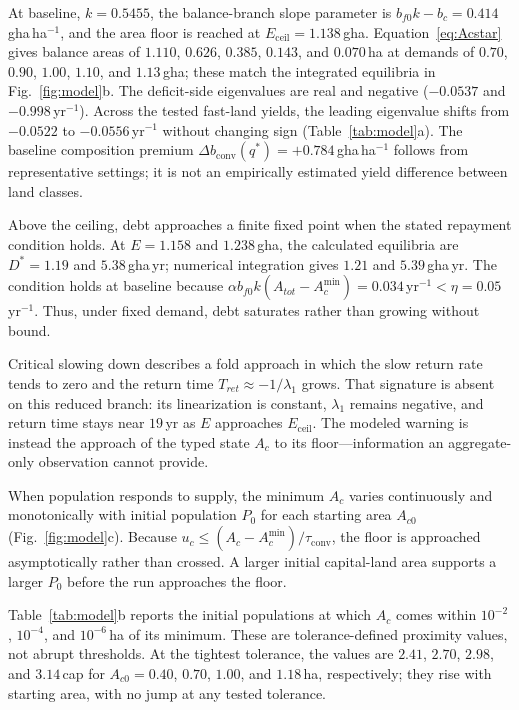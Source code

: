 \documentclass[preprint,12pt,authoryear]{elsarticle}
\newcommand{\dconv}{\Delta b_{\mathrm{conv}}}
\newcommand{\Eceil}{E_{\mathrm{ceil}}}
\newcommand{\Acmin}{A_c^{\min}}
\newcommand{\tconv}{\tau_{\mathrm{conv}}}
\begin{document}
At baseline, $k=0.5455$, the balance-branch slope parameter is $b_{f0}k-b_c=0.414$\,gha\,ha$^{-1}$, and the area floor is reached at $\Eceil=1.138$\,gha. Equation~\eqref{eq:Acstar} gives balance areas of $1.110$, $0.626$, $0.385$, $0.143$, and $0.070$\,ha at demands of $0.70$, $0.90$, $1.00$, $1.10$, and $1.13$\,gha; these match the integrated equilibria in Fig.~\ref{fig:model}b. The deficit-side eigenvalues are real and negative ($-0.0537$ and $-0.998$\,yr$^{-1}$). Across the tested fast-land yields, the leading eigenvalue shifts from $-0.0522$ to $-0.0556$\,yr$^{-1}$ without changing sign (Table~\ref{tab:model}a). The baseline composition premium $\dconv(q^*)=+0.784$\,gha\,ha$^{-1}$ follows from representative settings; it is not an empirically estimated yield difference between land classes.

Above the ceiling, debt approaches a finite fixed point when the stated repayment condition holds. At $E=1.158$ and $1.238$\,gha, the calculated equilibria are $D^*=1.19$ and $5.38$\,gha\,yr; numerical integration gives $1.21$ and $5.39$\,gha\,yr. The condition holds at baseline because $\alpha b_{f0}k(A_{tot}-\Acmin)=0.034$\,yr$^{-1}<\eta=0.05$\,yr$^{-1}$. Thus, under fixed demand, debt saturates rather than growing without bound.

Critical slowing down describes a fold approach in which the slow return rate tends to zero and the return time $T_{ret}\approx-1/\lambda_1$ grows. That signature is absent on this reduced branch: its linearization is constant, $\lambda_1$ remains negative, and return time stays near $19$\,yr as $E$ approaches $\Eceil$. The modeled warning is instead the approach of the typed state $A_c$ to its floor—information an aggregate-only observation cannot provide.

When population responds to supply, the minimum $A_c$ varies continuously and monotonically with initial population $P_0$ for each starting area $A_{c0}$ (Fig.~\ref{fig:model}c). Because $u_c\le(A_c-\Acmin)/\tconv$, the floor is approached asymptotically rather than crossed. A larger initial capital-land area supports a larger $P_0$ before the run approaches the floor.

Table~\ref{tab:model}b reports the initial populations at which $A_c$ comes within $10^{-2}$, $10^{-4}$, and $10^{-6}$\,ha of its minimum. These are tolerance-defined proximity values, not abrupt thresholds. At the tightest tolerance, the values are $2.41$, $2.70$, $2.98$, and $3.14$\,cap for $A_{c0}=0.40$, $0.70$, $1.00$, and $1.18$\,ha, respectively; they rise with starting area, with no jump at any tested tolerance.
\end{document}
